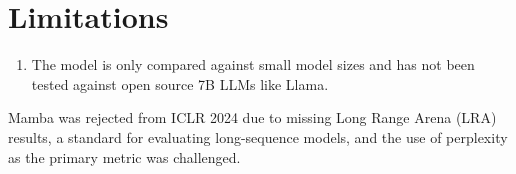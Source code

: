 \documentclass{article}
\begin{document}
\section*{Limitations}

\begin{enumerate}
    \item The model is only compared against small model sizes and has not been tested against open
    source 7B LLMs like Llama.
\end{enumerate}

Mamba was rejected from ICLR 2024 due to missing Long Range Arena (LRA) results, a standard for evaluating long-sequence models, and the use of perplexity as the primary metric was challenged.
\end{document}
